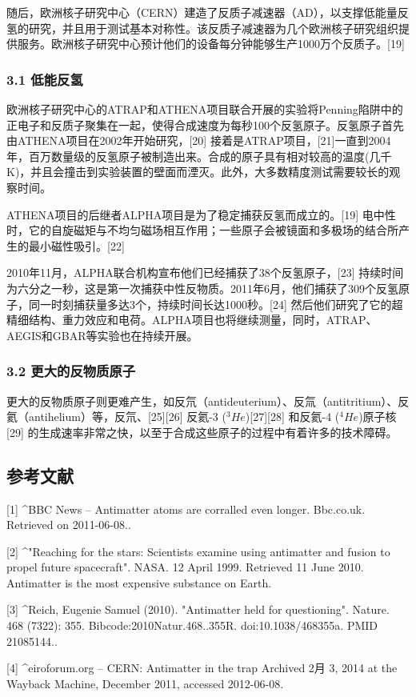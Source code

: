 随后，欧洲核子研究中心（CERN）建造了反质子减速器（AD），以支撑低能量反氢的研究，并且用于测试基本对称性。该反质子减速器为几个欧洲核子研究组织提供服务。欧洲核子研究中心预计他们的设备每分钟能够生产1000万个反质子。[19]
\subsubsection{3.1 低能反氢}
欧洲核子研究中心的ATRAP和ATHENA项目联合开展的实验将Penning陷阱中的正电子和反质子聚集在一起，使得合成速度为每秒100个反氢原子。反氢原子首先由ATHENA项目在2002年开始研究，[20] 接着是ATRAP项目，[21]一直到2004年，百万数量级的反氢原子被制造出来。合成的原子具有相对较高的温度(几千K)，并且会撞击到实验装置的壁面而湮灭。此外，大多数精度测试需要较长的观察时间。

ATHENA项目的后继者ALPHA项目是为了稳定捕获反氢而成立的。[19] 电中性时，它的自旋磁矩与不均匀磁场相互作用；一些原子会被镜面和多极场的结合所产生的最小磁性吸引。[22]

2010年11月，ALPHA联合机构宣布他们已经捕获了38个反氢原子，[23] 持续时间为六分之一秒，这是第一次捕获中性反物质。2011年6月，他们捕获了309个反氢原子，同一时刻捕获量多达3个，持续时间长达1000秒。[24] 然后他们研究了它的超精细结构、重力效应和电荷。ALPHA项目也将继续测量，同时，ATRAP、AEGIS和GBAR等实验也在持续开展。
\subsubsection{3.2 更大的反物质原子}
更大的反物质原子则更难产生，如反氘（antideuterium）、反氚（antitritium）、反氦（antihelium）等，反氘、[25][26] 反氦-3 ($^3He$)[27][28] 和反氦-4 ($^4He$)原子核[29] 的生成速率非常之快，以至于合成这些原子的过程中有着许多的技术障碍。

\subsection{参考文献}
[1]
^BBC News – Antimatter atoms are corralled even longer. Bbc.co.uk. Retrieved on 2011-06-08..

[2]
^"Reaching for the stars: Scientists examine using antimatter and fusion to propel future spacecraft". NASA. 12 April 1999. Retrieved 11 June 2010. Antimatter is the most expensive substance on Earth.

[3]
^Reich, Eugenie Samuel (2010). "Antimatter held for questioning". Nature. 468 (7322): 355. Bibcode:2010Natur.468..355R. doi:10.1038/468355a. PMID 21085144..

[4]
^eiroforum.org – CERN: Antimatter in the trap Archived 2月 3, 2014 at the Wayback Machine, December 2011, accessed 2012-06-08.

